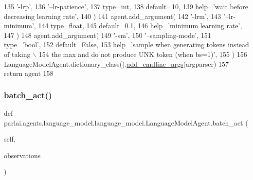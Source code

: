 \begin{DoxyCode}
135             \textcolor{stringliteral}{'-lrp'},
136             \textcolor{stringliteral}{'--lr-patience'},
137             type=int,
138             default=10,
139             help=\textcolor{stringliteral}{'wait before decreasing learning rate'},
140         )
141         agent.add\_argument(
142             \textcolor{stringliteral}{'-lrm'},
143             \textcolor{stringliteral}{'--lr-minimum'},
144             type=float,
145             default=0.1,
146             help=\textcolor{stringliteral}{'minimum learning rate'},
147         )
148         agent.add\_argument(
149             \textcolor{stringliteral}{'-sm'},
150             \textcolor{stringliteral}{'--sampling-mode'},
151             type=\textcolor{stringliteral}{'bool'},
152             default=\textcolor{keyword}{False},
153             help=\textcolor{stringliteral}{'sample when generating tokens instead of taking \(\backslash\)}
154 \textcolor{stringliteral}{                           the max and do not produce UNK token (when bs=1)'},
155         )
156         LanguageModelAgent.dictionary\_class().\hyperlink{namespaceparlai_1_1agents_1_1drqa_1_1config_a62fdd5554f1da6be0cba185271058320}{add\_cmdline\_args}(argparser)
157         \textcolor{keywordflow}{return} agent
158 
\end{DoxyCode}
\mbox{\label{classparlai_1_1agents_1_1language__model_1_1language__model_1_1LanguageModelAgent_a91a1386cee7fa786aa817a58646cda5e}} 
\subsubsection{\texorpdfstring{batch\+\_\+act()}{batch\_act()}}
{\footnotesize\ttfamily def parlai.\+agents.\+language\+\_\+model.\+language\+\_\+model.\+Language\+Model\+Agent.\+batch\+\_\+act (\begin{DoxyParamCaption}\item[{}]{self,  }\item[{}]{observations }\end{DoxyParamCaption})}



